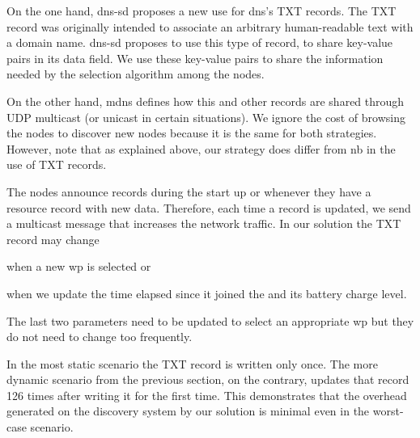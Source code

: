 On the one hand, \ac{dns-sd} proposes a new use for \ac{dns}'s TXT records.
The TXT record was originally intended to associate an arbitrary human-readable text with a domain name.
\ac{dns-sd} proposes to use this type of record, to share key-value pairs in its data field.
We use these key-value pairs to share the information needed by the selection algorithm among the nodes.

On the other hand, \ac{mdns} defines how this and other records are shared through UDP multicast (or unicast in certain situations).
We ignore the cost of browsing the nodes to discover new nodes because it is the same for both strategies.
However, note that as explained above, our strategy does differ from \acl{nb} in the use of TXT records.

The nodes announce records during the start up or whenever they have a resource record with new data.
Therefore, each time a record is updated, we send a multicast message that increases the network traffic.
In our solution the TXT record may change 
\begin{enumerate*}[label=\itshape(\arabic*\upshape)]
  \item when a new \ac{wp} is selected or
  \item when we update the time elapsed since it joined the \Space{} and its battery charge level.
\end{enumerate*}
The last two parameters need to be updated to select an appropriate \ac{wp} but they do not need to change too frequently.

In the most static scenario the TXT record is written only once.
The more dynamic scenario from the previous section, on the contrary, updates that record 126 times after writing it for the first time.
This demonstrates that the overhead generated on the discovery system by our solution is minimal even in the worst-case scenario.